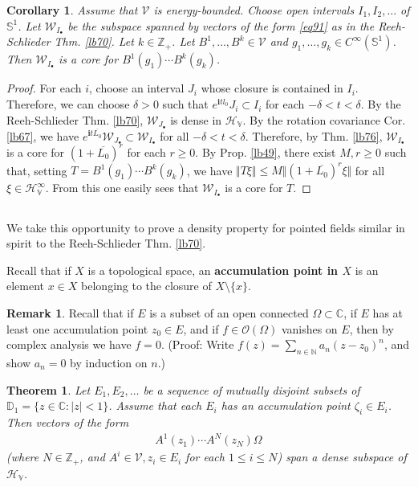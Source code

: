 \documentclass[12pt,b5paper,notitlepage]{article}
\theoremstyle{definition}
\newtheorem{rem}[df]{Remark}
\theoremstyle{plain}
\newtheorem{thm}[df]{Theorem}
\newtheorem{co}[df]{Corollary}
\newcommand{\mc}{\mathcal}
\newcommand{\ovl}{\overline}
\newcommand{\scr}{\mathscr}
\newcommand{\im}{\mathbf{i}}
\newcommand{\blt}{\bullet}
\newcommand{\Cbb}{\mathbb C}
\newcommand{\Nbb}{\mathbb N}
\newcommand{\Zbb}{\mathbb Z}
\newcommand{\Dbb}{\mathbb D}
\newcommand{\Sbb}{{\mathbb S}}
\newcommand{\HV}{\mathcal H_{\mathbb V}}
\numberwithin{equation}{section}
\begin{document}
\begin{co}\label{lb88}
Assume that $\mc V$ is energy-bounded. Choose open intervals $I_1,I_2,\dots$ of $\Sbb^1$. Let $\mc W_{I_\blt}$ be the subspace spanned by vectors of the form \eqref{eq91} as in the Reeh-Schlieder Thm. \ref{lb70}. Let $k\in\Zbb_+$. Let $B^1,\dots,B^k\in\mc V$ and $g_1,\dots,g_k\in C^\infty(\Sbb^1)$. Then $\mc W_{I_\blt}$ is a core for $B^1(g_1)\cdots B^k(g_k)$.
\end{co}


\begin{proof}
For each $i$, choose an interval $J_i$ whose closure is contained in $I_i$. Therefore, we can choose $\delta>0$ such that $e^{\im tl_0 }J_i\subset I_i$ for each $-\delta<t<\delta$. By the Reeh-Schlieder Thm. \ref{lb70}, $\mc W_{J_\blt}$ is dense in $\HV$. By the rotation covariance Cor. \ref{lb67}, we have $e^{\im t\ovl{L_0}}\mc W_{J_\blt}\subset\mc W_{I_\blt}$ for all $-\delta<t<\delta$. Therefore, by Thm. \ref{lb76}, $\mc W_{I_\blt}$ is a core for $(1+\ovl{L_0})^r$ for each $r\geq0$. By Prop. \ref{lb49}, there exist $M,r\geq0$ such that, setting $T=B^1(g_1)\cdots B^k(g_k)$, we have $\Vert T\xi\Vert\leq M\Vert (1+\ovl{L_0})^r\xi\Vert$ for all $\xi\in\HV^\infty$. From this one easily sees that  $\mc W_{I_\blt}$ is a core for $T$.
\end{proof}






\subsection{}




We take this opportunity to prove a density property for pointed fields similar in spirit to the Reeh-Schlieder Thm. \ref{lb70}.


Recall that if $X$ is a topological space, an \textbf{accumulation point in $X$}  is an element $x\in X$ belonging to the closure of $X\setminus\{x\}$. 

\begin{rem}\label{lb71}
Recall that if $E$ is a subset of an open connected $\Omega\subset\Cbb$, if $E$ has at least one accumulation point $z_0\in E$, and if $f\in\scr O(\Omega)$ vanishes on $E$, then by complex analysis we have $f=0$. (Proof: Write $f(z)=\sum_{n\in\Nbb}a_n(z-z_0)^n$, and show $a_n=0$ by induction on $n$.)
\end{rem}


\begin{thm}\label{lb72}
Let $E_1,E_2,\dots$ be a sequence of mutually disjoint subsets of $\Dbb_1=\{z\in\Cbb:|z|<1\}$. Assume that each $E_i$ has an accumulation point $\zeta_i\in E_i$. Then vectors of the form
\begin{align}\label{eq92}
A^1(z_1)\cdots A^N(z_N)\Omega
\end{align}
(where $N\in\Zbb_+$, and $A^i\in\mc V,z_i\in E_i$ for each $1\leq i\leq N$) span a dense subspace of $\HV$.
\end{thm}
\end{document}
